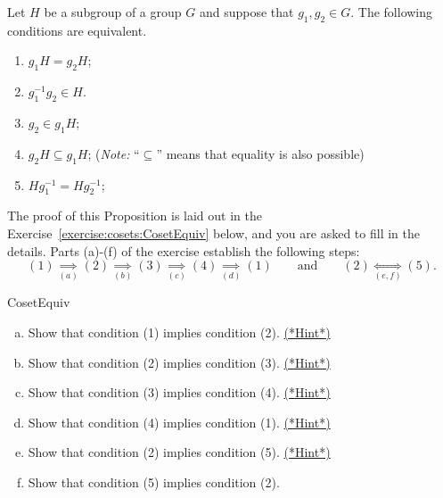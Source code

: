 \begin{thm}\label{cosets_theorem_1}
Let $H$ be a subgroup of a group $G$ and suppose that $g_1, g_2 \in G$.  The following conditions are equivalent.  
\begin{enumerate}
 
\item
$g_1 H = g_2 H$; 

\item
$g_1^{-1} g_2 \in H$.

\item
$g_2 \in g_1 H$; 

\item
$g_2 H \subseteq g_1 H$; \qquad (\emph{Note:} ``$\subseteq$'' means that equality is also possible)

\item
$H g_1^{-1}  = H g_2^{-1}$; 


 \end{enumerate}
\end{thm}
The proof of this Proposition is laid out in the Exercise~\ref{exercise:cosets:CosetEquiv} below, and you are asked to fill in the details. Parts (a)-(f) of the exercise establish the following steps:
\[ (1) \underset{(a)}\implies (2) \underset{(b)}\implies (3) \underset{(c)}\implies (4) \underset{(d)}\implies (1) \qquad \text{and} \qquad (2) \underset{(e,f)}\Leftrightarrow (5). \]


\begin{exercise}{CosetEquiv}
\begin{enumerate}[(a)]
\item
Show that condition (1) implies condition (2).  
\hyperref[sec:cosets:hints]{(*Hint*)}

\item
Show that condition (2) implies condition (3).
\hyperref[sec:cosets:hints]{(*Hint*)}


\item
Show that condition (3) implies condition (4).
\hyperref[sec:cosets:hints]{(*Hint*)}

\item
Show that condition (4) implies condition (1).
\hyperref[sec:cosets:hints]{(*Hint*)}

\item
Show that condition (2) implies condition (5).
\hyperref[sec:cosets:hints]{(*Hint*)}

\item
Show that condition (5) implies condition (2).
\end{enumerate}
\end{exercise}

